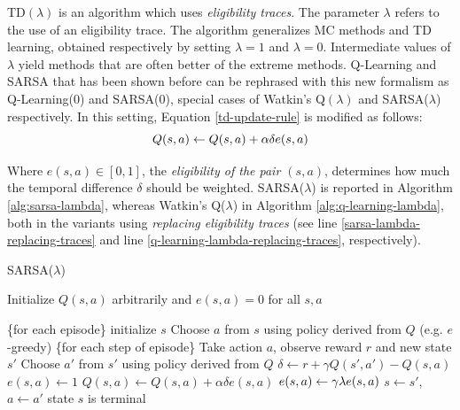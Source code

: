 TD$(\lambda)$ is an algorithm which uses \emph{eligibility traces}. The parameter $\lambda$ refers to the use of an eligibility trace. The algorithm generalizes MC methods and TD learning, obtained respectively by setting $\lambda = 1$ and $\lambda = 0$. Intermediate values of $\lambda$ yield methods that are often better of the extreme methods. 
Q-Learning and SARSA that has been shown before can be rephrased with this new formalism as Q-Learning(0) and SARSA(0), special cases of Watkin's Q$(\lambda)$ and SARSA($\lambda$) respectively.
In this setting, Equation \ref{td-update-rule} is modified as follows:
\begin{equation}\label{td-lambda-update-rule}
Q(s, a) \leftarrow Q(s, a) + \alpha \delta e(s, a)
\end{equation}

Where $e(s, a) \in [0, 1]$, the \emph{eligibility of the pair $(s, a)$}, determines how much the temporal difference $\delta$ should be weighted.
SARSA($\lambda$) is reported in Algorithm \ref{alg:sarsa-lambda}, whereas Watkin's Q($\lambda$) in Algorithm \ref{alg:q-learning-lambda}, both  in the variants using \emph{replacing eligibility traces} (see line \ref{sarsa-lambda-replacing-traces} and line \ref{q-learning-lambda-replacing-traces}, respectively).
\begin{algorithm}
	\caption{SARSA($\lambda$) \citep{Singh:1996:RLR:225667.225679}}
	\label{alg:sarsa-lambda}
	\begin{algorithmic}[1]
		\State Initialize $Q(s, a)$ arbitrarily and $e(s, a)=0$ for all $s, a$
		
		\Repeat \{for each episode\} 
			\State initialize $s$
			\State Choose $a$ from $s$ using policy derived from $Q$ (e.g. $e$-greedy)
			\Repeat \{for each step of episode\}
				\State Take action $a$, observe reward $r$ and new state $s'$
				\State Choose $a'$ from $s'$ using policy derived from $Q$
				\State $\delta \gets r + \gamma Q(s', a') - Q(s, a)$
				\State $e(s, a) \gets 1$  \label{sarsa-lambda-replacing-traces}
					\State $Q(s, a) \gets Q(s, a) + \alpha\delta e(s, a)$
					\State $e(s, a) \gets \gamma\lambda e(s, a)$
				\EndFor
				\State $s\gets s'$, $a \gets a'$
			\Until state $s$ is terminal
		\Until
	\end{algorithmic}
	
\end{algorithm}
